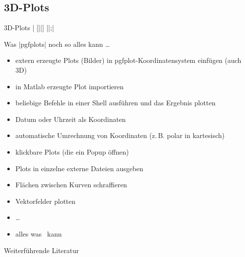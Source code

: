 \documentclass[
	vorläufig=true,
	datum=2016-12-02,
	titel={Diagramme},
	web=false,
]{../tex/latexkurs-slides}
\begin{document}
\subsection{3D-Plots}
\begin{frame}[fragile,t]{3D-Plots}%
| [||] {||};| \vfill
\begin{LTXexample}[pos=r, explpreset={}, preset=\small, rframe={}]
\end{LTXexample}
\end{frame}






\begin{frame}{Was |pgfplots| noch so alles kann …}
\begin{itemize}
\item extern erzeugte Plots (Bilder) in pgfplot-Koordinatensystem einfügen (auch 3D)
\item in Matlab erzeugte Plot importieren
\item beliebige Befehle in einer Shell ausführen und das Ergebnis plotten
\item Datum oder Uhrzeit als Koordinaten
\item automatische Umrechnung von Koordinaten (z.\,B. polar in kartesisch)
\item klickbare Plots (die ein Popup öffnen)
\item Plots in einzelne externe Dateien ausgeben
\item Flächen zwischen Kurven schraffieren
\item Vektorfelder plotten
\item …
\item alles was \TikZ\ kann
\end{itemize}
\end{frame}

\nocite{pgfplots}
\begin{frame}[allowframebreaks]{Weiterführende Literatur}
\printbibliography
\end{frame}
\end{document}
